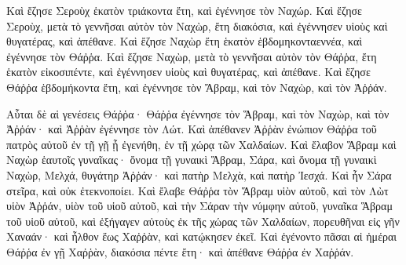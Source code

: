 {Καὶ ἔζησε Σεροὺχ ἑκατὸν τριάκοντα ἔτη, καὶ ἐγέννησε τὸν Ναχώρ.
Καὶ ἔζησε Σεροὺχ, μετὰ τὸ γεννῆσαι αὐτὸν τὸν Ναχὼρ, ἔτη διακόσια, καὶ ἐγέννησεν υἱοὺς καὶ θυγατέρας, καὶ ἀπέθανε.
Καὶ ἔζησε Ναχὼρ ἔτη ἑκατὸν ἑβδομηκονταεννέα, καὶ ἐγέννησε τὸν Θάῤῥα.
Καὶ ἔζησε Ναχὼρ, μετὰ τὸ γεννῆσαι αὐτὸν τὸν Θάῤῥα, ἔτη ἑκατὸν εἰκοσιπέντε, καὶ ἐγέννησεν υἱοὺς καὶ θυγατέρας, καὶ ἀπέθανε.
Καὶ ἔζησε Θάῤῥα ἑβδομήκοντα ἔτη, καὶ ἐγέννησε τὸν Ἄβραμ, καὶ τὸν Ναχὼρ, καὶ τὸν Ἀῤῥάν.
\par }{\PP {}Αὗται δὲ αἱ γενέσεις Θάῤῥα· Θάῤῥα ἐγέννησε τὸν Ἅβραμ, καὶ τὸν Ναχὼρ, καὶ τὸν Ἀῤῥάν· καὶ Ἀῤῥὰν ἐγέννησε τὸν Λώτ.
Καὶ ἀπέθανεν Ἀῤῥὰν ἐνώπιον Θάῤῥα τοῦ πατρὸς αὐτοῦ ἐν τῇ γῇ ᾗ ἐγενήθη, ἐν τῇ χώρᾳ τῶν Χαλδαίων.
Καὶ ἔλαβον Ἅβραμ καὶ Ναχὼρ ἑαυτοῖς γυναῖκας· ὄνομα τῇ γυναικὶ Ἅβραμ, Σάρα, καὶ ὄνομα τῇ γυναικὶ Ναχὼρ, Μελχά, θυγάτηρ Ἀῤῥάν· καὶ πατὴρ Μελχὰ, καὶ πατὴρ Ἰεσχά.
Καὶ ἦν Σάρα στεῖρα, καὶ οὐκ ἐτεκνοποίει.
Καὶ ἔλαβε Θάῤῥα τὸν Ἅβραμ υἱὸν αὐτοῦ, καὶ τὸν Λὼτ υἱὸν Ἀῤῥάν, υἱὸν τοῦ υἱοῦ αὐτοῦ, καὶ τὴν Σάραν τὴν νύμφην αὐτοῦ, γυναῖκα Ἅβραμ τοῦ υἱοῦ αὐτοῦ, καὶ ἐξήγαγεν αὐτοὺς ἐκ τῆς χώρας τῶν Χαλδαίων, πορευθῆναι εἰς γῆν Χαναάν· καὶ ἦλθον ἕως Χαῤῥὰν, καὶ κατῴκησεν ἐκεῖ.
Καὶ ἐγένοντο πᾶσαι αἱ ἡμέραι Θάῤῥα ἐν γῇ Χαῤῥὰν, διακόσια πέντε ἔτη· καὶ ἀπέθανε Θάῤῥα ἐν Χαῤῥάν.

}
